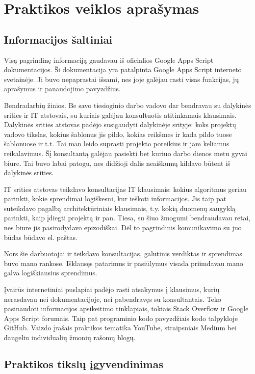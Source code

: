 \documentclass{VUMIFPSkursinis}
\begin{document}
\section{Praktikos veiklos aprašymas}

\subsection{Informacijos šaltiniai}
Visą pagrindinę informaciją gaudavau iš oficialios Google Apps Script dokumentacijos. Ši dokumentacija yra patalpinta Google Apps Script interneto svetainėje. Ji buvo nepaprastai išsami, nes joje galėjau rasti visas funkcijas, jų aprašymus ir panaudojimo pavyzdžius.

Bendradarbių žinios. Be savo tiesioginio darbo vadovo dar bendravau su dalykinės srities ir IT atstovais, su kuriais galėjau konsultuotis atitinkamais klausimais. Dalykinės srities atstovas padėjo susigaudyti dalykinėje srityje: koks projektų vadovo tikslas, kokius šablonus jis pildo, kokias reikšmes ir kada pildo tuose šablonuose ir t.t. Tai man leido suprasti projekto poreikius ir jam keliamus reikalavimus. Šį konsultantą galėjau pasiekti bet kuriuo darbo dienos metu gyvai biure. Tai buvo labai patogu, nes didžioji dalis neaiškumų kildavo būtent iš dalykinės srities.

IT srities atstovas teikdavo konsultacijas IT klausimais: kokius algoritmus geriau parinkti, kokie sprendimai logiškesni, kur ieškoti informacijos. Jis taip pat suteikdavo pagalbą architektūriniais klausimais, t.y. kokią duomenų saugyklą parinkti, kaip įdiegti projektą ir pan. Tiesa, su šiuo žmogumi bendraudavau retai, nes biure jis pasirodydavo epizodiškai. Dėl to pagrindinis komunikavimo su juo būdas būdavo el. paštas. 

Nors šie darbuotojai ir teikdavo konsultacijas, galutinis verdiktas ir sprendimas buvo mano rankose. Išklausęs patarimus ir pasiūlymus visada priimdavau mano galva logiškiausius sprendimus.

Įvairūs internetiniai puslapiai padėjo rasti atsakymus į klausimus, kurių nerasdavau nei dokumentacijoje, nei pabendravęs su konsultantais. Teko pasinaudoti informacijos apsikeitimo tinklapiais, tokiais Stack Overflow ir Google Apps Script forumais. Taip pat programinio kodo pavyzdžiais kodo talpykloje GitHub. Vaizdo įrašais praktikos tematika YouTube, straipsniais Medium bei daugeliu individualių žmonių rašomų blogų.

\subsection{Praktikos tikslų įgyvendinimas}
\end{document}
